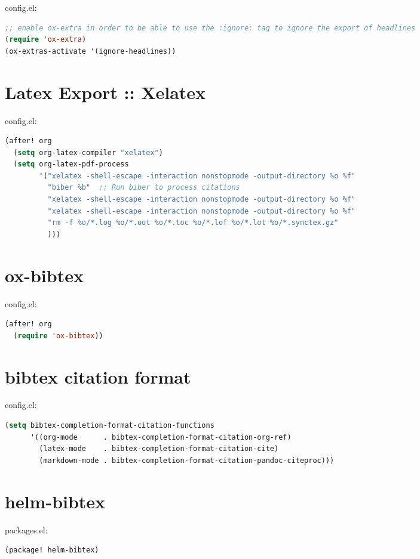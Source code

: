 \documentclass[a4paper,oneside,toc=bibliography,toc=listof]{scrbook}
\newenvironment{widemargin}{
\begin{center}
\begin{adjustwidth}{-1.5cm}{-1.5cm}
}{
\end{adjustwidth}
\end{center}
}
\begin{document}
config.el:
\begin{widemargin}
\begin{lstlisting}[language=Lisp,numbers=none]
;; enable ox-extra in order to be able to use the :ignore: tag to ignore the export of headlines
(require 'ox-extra)
(ox-extras-activate '(ignore-headlines))
\end{lstlisting}
\end{widemargin}
\section{Latex Export :: Xelatex}
\label{sec:orga145337}

config.el:
\begin{lstlisting}[language=Lisp,numbers=none]
(after! org
  (setq org-latex-compiler "xelatex")
  (setq org-latex-pdf-process
        '("xelatex -shell-escape -interaction nonstopmode -output-directory %o %f"
          "biber %b"  ;; Run biber to process citations
          "xelatex -shell-escape -interaction nonstopmode -output-directory %o %f"
          "xelatex -shell-escape -interaction nonstopmode -output-directory %o %f"
          "rm -f %o/*.log %o/*.out %o/*.toc %o/*.lof %o/*.lot %o/*.synctex.gz"
          )))
\end{lstlisting}
\section{ox-bibtex}
\label{sec:orgf666890}
config.el:
\begin{lstlisting}[language=Lisp,numbers=none]
(after! org
  (require 'ox-bibtex))
\end{lstlisting}
\section{bibtex citation format}
\label{sec:org8354eb2}
config.el:
\begin{lstlisting}[language=Lisp,numbers=none]
(setq bibtex-completion-format-citation-functions
      '((org-mode      . bibtex-completion-format-citation-org-ref)
        (latex-mode    . bibtex-completion-format-citation-cite)
        (markdown-mode . bibtex-completion-format-citation-pandoc-citeproc)))
\end{lstlisting}
\section{helm-bibtex}
\label{sec:orgfafd4eb}

packages.el:
\begin{lstlisting}[language=Lisp,numbers=none]
(package! helm-bibtex)
\end{lstlisting}
\end{document}
